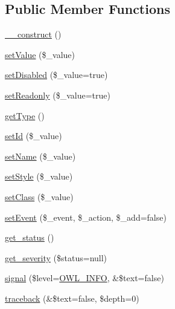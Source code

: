 \subsection*{Public Member Functions}
\begin{DoxyCompactItemize}
\item 
\hyperlink{classFormFieldFile_a2e19b30454dd3ed054772868bf6eebad}{\_\-\_\-construct} ()
\item 
\hyperlink{classFormField_a465ff61e290d82be96bb793c3a14b3e7}{setValue} (\$\_\-value)
\item 
\hyperlink{classFormField_a9fa2c828eaf98154edfaa2e755657117}{setDisabled} (\$\_\-value=true)
\item 
\hyperlink{classFormField_a6eabbb35d24b1698ea25b66ddfd88a64}{setReadonly} (\$\_\-value=true)
\item 
\hyperlink{classFormField_a1f64b737bccb6b2827f8c5665b9920c7}{getType} ()
\item 
\hyperlink{classBaseElement_a0c1ce3d1684ecb78960cf7a97278494e}{setId} (\$\_\-value)
\item 
\hyperlink{classBaseElement_a39bafb3609d10048920c20242c2a04c5}{setName} (\$\_\-value)
\item 
\hyperlink{classBaseElement_a6b2b9ff69f6e92db82f91d9c55cda697}{setStyle} (\$\_\-value)
\item 
\hyperlink{classBaseElement_af6597b30fa9798878f6290271043dfa2}{setClass} (\$\_\-value)
\item 
\hyperlink{classBaseElement_ad5789f45f16aaa144716ee8558069c31}{setEvent} (\$\_\-event, \$\_\-action, \$\_\-add=false)
\item 
\hyperlink{class__OWL_a99ec771fa2c5c279f80152cc09e489a8}{get\_\-status} ()
\item 
\hyperlink{class__OWL_adf9509ef96858be7bdd9414c5ef129aa}{get\_\-severity} (\$status=null)
\item 
\hyperlink{class__OWL_a51ba4a16409acf2a2f61f286939091a5}{signal} (\$level=\hyperlink{owl_8severitycodes_8php_a139328861128689f2f4def6a399d9057}{OWL\_\-INFO}, \&\$text=false)
\item 
\hyperlink{class__OWL_aa29547995d6741b7d2b90c1d4ea99a13}{traceback} (\&\$text=false, \$depth=0)
\end{DoxyCompactItemize}

